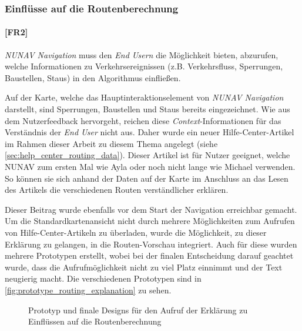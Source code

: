 \subsubsection{Einflüsse auf die Routenberechnung}

\paragraph{[FR2]} \textit{NUNAV Navigation} muss den \textit{End Usern} die Möglichkeit bieten, abzurufen, welche Informationen zu Verkehrsereignissen (z.B. Verkehrsfluss, Sperrungen, Baustellen, Staus) in den Algorithmus einfließen.

\bigskip

Auf der Karte, welche das Hauptinteraktionselement von \textit{NUNAV Navigation} darstellt, sind Sperrungen, Baustellen und Staus bereits eingezeichnet. Wie aus dem Nutzerfeedback hervorgeht, reichen diese \textit{Context}-Informationen für das Verständnis der \textit{End User} nicht aus. Daher wurde ein neuer Hilfe-Center-Artikel im Rahmen dieser Arbeit zu diesem Thema angelegt (siehe \autoref{sec:help_center_routing_data}). Dieser Artikel ist für Nutzer geeignet, welche NUNAV zum ersten Mal wie Ayla oder noch nicht lange wie Michael verwenden. So können sie sich anhand der Daten auf der Karte im Anschluss an das Lesen des Artikels die verschiedenen Routen verständlicher erklären.

Dieser Beitrag wurde ebenfalls vor dem Start der Navigation erreichbar gemacht. Um die Standardkartenansicht nicht durch mehrere Möglichkeiten zum Aufrufen von Hilfe-Center-Artikeln zu überladen, wurde die Möglichkeit, zu dieser Erklärung zu gelangen, in die Routen-Vorschau integriert. Auch für diese wurden mehrere Prototypen erstellt, wobei bei der finalen Entscheidung darauf geachtet wurde, dass die Aufrufmöglichkeit nicht zu viel Platz einnimmt und der Text neugierig macht. Die verschiedenen Prototypen sind in \autoref{fig:prototype_routing_explanation} zu sehen.

\begin{figure}[htb!]
    \centering
    \hspace{.055\textwidth}
    \hspace{.055\textwidth}
    \caption{Prototyp und finale Designs für den Aufruf der Erklärung zu Einflüssen auf die Routenberechnung}
    \label{fig:prototype_routing_explanation}
\end{figure}